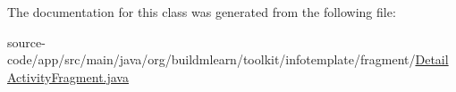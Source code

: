 The documentation for this class was generated from the following file\+:\begin{DoxyCompactItemize}
\item 
source-\/code/app/src/main/java/org/buildmlearn/toolkit/infotemplate/fragment/\hyperlink{infotemplate_2fragment_2DetailActivityFragment_8java}{Detail\+Activity\+Fragment.\+java}\end{DoxyCompactItemize}
